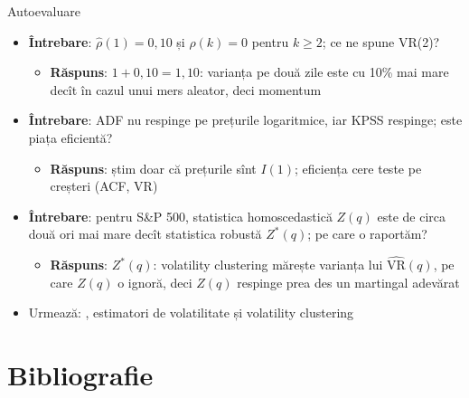 \begin{frame}{Autoevaluare}
\itemsize{\small}
\begin{itemize}
    \item \textbf{Întrebare}: $\hat\rho(1) = 0{,}10$ și $\hat\rho(k) = 0$ pentru $k \ge 2$; ce ne spune VR(2)?
    \begin{itemize}
        \item \textbf{Răspuns}: $1 + 0{,}10 = 1{,}10$: varianța pe două zile este cu 10\% mai mare decît în cazul unui mers aleator, deci momentum
    \end{itemize}
    \item \textbf{Întrebare}: ADF nu respinge pe prețurile logaritmice, iar KPSS respinge; este piața eficientă?
    \begin{itemize}
        \item \textbf{Răspuns}: știm doar că prețurile sînt $I(1)$; eficiența cere teste pe creșteri (ACF, VR)
    \end{itemize}
    \item \textbf{Întrebare}: pentru S\&P 500, statistica homoscedastică $Z(q)$ este de circa două ori mai mare decît statistica robustă $Z^*(q)$; pe care o raportăm?
    \begin{itemize}
        \item \textbf{Răspuns}: $Z^*(q)$: volatility clustering mărește varianța lui $\widehat{\mathrm{VR}}(q)$, pe care $Z(q)$ o ignoră, deci $Z(q)$ respinge prea des un martingal adevărat
    \end{itemize}
    \item Urmează: , estimatori de volatilitate și volatility clustering
\end{itemize}
\end{frame}


\section{Bibliografie}

